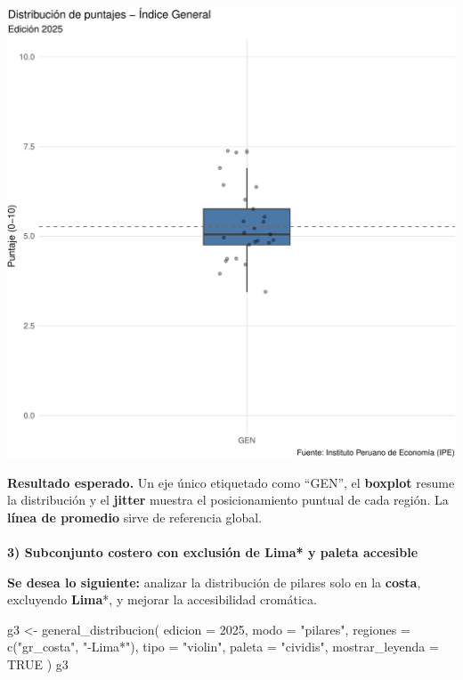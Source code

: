 \documentclass[
  11pt,
  letterpaper,
  DIV=11,
  numbers=noendperiod]{scrartcl}
\makeatletter
\let\oldparagraph\paragraph
\renewcommand{\paragraph}{
    \@ifstar
      \xxxParagraphStar
      \xxxParagraphNoStar
  }
\newcommand{\xxxParagraphStar}[1]{\oldparagraph*{#1}\mbox{}}
\newcommand{\xxxParagraphNoStar}[1]{\oldparagraph{#1}\mbox{}}
\newenvironment{Shaded}{\begin{snugshade}}{\end{snugshade}}
\newcommand{\AttributeTok}[1]{\textcolor[rgb]{0.40,0.45,0.13}{#1}}
\newcommand{\ConstantTok}[1]{\textcolor[rgb]{0.56,0.35,0.01}{#1}}
\newcommand{\DecValTok}[1]{\textcolor[rgb]{0.68,0.00,0.00}{#1}}
\newcommand{\FunctionTok}[1]{\textcolor[rgb]{0.28,0.35,0.67}{#1}}
\newcommand{\NormalTok}[1]{\textcolor[rgb]{0.00,0.23,0.31}{#1}}
\newcommand{\OtherTok}[1]{\textcolor[rgb]{0.00,0.23,0.31}{#1}}
\newcommand{\StringTok}[1]{\textcolor[rgb]{0.13,0.47,0.30}{#1}}
\makeatother
\begin{document}
\includegraphics{Manual_files/figure-pdf/unnamed-chunk-27-1.pdf}

\textbf{Resultado esperado.} Un eje único etiquetado como ``GEN'', el
\textbf{boxplot} resume la distribución y el \textbf{jitter} muestra el
posicionamiento puntual de cada región. La \textbf{línea de promedio}
sirve de referencia global.

\paragraph{\texorpdfstring{\textbf{3) Subconjunto costero con exclusión
de Lima* y paleta
accesible}}{3) Subconjunto costero con exclusión de Lima* y paleta accesible}}\label{subconjunto-costero-con-exclusiuxf3n-de-lima-y-paleta-accesible}

\textbf{Se desea lo siguiente:} analizar la distribución de pilares solo
en la \textbf{costa}, excluyendo \textbf{Lima}*, y mejorar la
accesibilidad cromática.

\begin{Shaded}
\begin{Highlighting}[]
\NormalTok{g3 }\OtherTok{\textless{}{-}} \FunctionTok{general\_distribucion}\NormalTok{(}
  \AttributeTok{edicion =} \DecValTok{2025}\NormalTok{,}
  \AttributeTok{modo    =} \StringTok{"pilares"}\NormalTok{,}
  \AttributeTok{regiones =} \FunctionTok{c}\NormalTok{(}\StringTok{"gr\_costa"}\NormalTok{, }\StringTok{"{-}Lima*"}\NormalTok{),}
  \AttributeTok{tipo    =} \StringTok{"violin"}\NormalTok{,}
  \AttributeTok{paleta  =} \StringTok{"cividis"}\NormalTok{,}
  \AttributeTok{mostrar\_leyenda =} \ConstantTok{TRUE}
\NormalTok{)}
\NormalTok{g3}
\end{Highlighting}
\end{Shaded}
\end{document}
